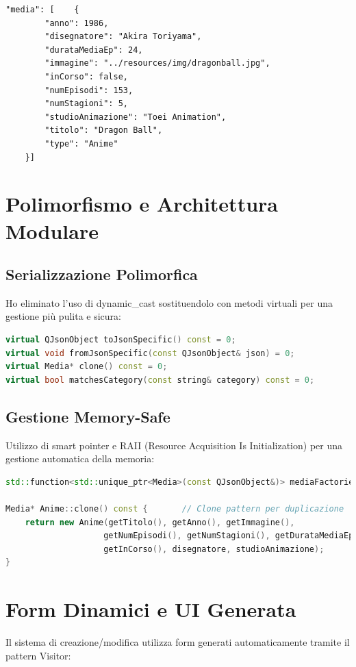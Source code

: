 \documentclass[a4paper,10pt]{article}
\begin{document}
\begin{lstlisting}[style=jsonstyle]
"media": [    {
        "anno": 1986,
        "disegnatore": "Akira Toriyama",
        "durataMediaEp": 24,
        "immagine": "../resources/img/dragonball.jpg",
        "inCorso": false,
        "numEpisodi": 153,
        "numStagioni": 5,
        "studioAnimazione": "Toei Animation",
        "titolo": "Dragon Ball",
        "type": "Anime"
    }]
\end{lstlisting}

\section{Polimorfismo e Architettura Modulare}

\subsection{Serializzazione Polimorfica}
Ho eliminato l'uso di dynamic\_cast sostituendolo con metodi virtuali per una gestione più pulita e sicura:

\begin{lstlisting}[language=cpp, style=cppstyle]
virtual QJsonObject toJsonSpecific() const = 0;
virtual void fromJsonSpecific(const QJsonObject& json) = 0;
virtual Media* clone() const = 0;
virtual bool matchesCategory(const string& category) const = 0;
\end{lstlisting}

\subsection{Gestione Memory-Safe}
Utilizzo di smart pointer e RAII (Resource Acquisition Is Initialization) per una gestione automatica della memoria:

\begin{lstlisting}[language=cpp, style=cppstyle]
std::function<std::unique_ptr<Media>(const QJsonObject&)> mediaFactories;

Media* Anime::clone() const {       // Clone pattern per duplicazione
    return new Anime(getTitolo(), getAnno(), getImmagine(), 
                    getNumEpisodi(), getNumStagioni(), getDurataMediaEp(), 
                    getInCorso(), disegnatore, studioAnimazione);
}
\end{lstlisting}

\section{Form Dinamici e UI Generata}
Il sistema di creazione/modifica utilizza form generati automaticamente tramite il pattern Visitor:
\end{document}
